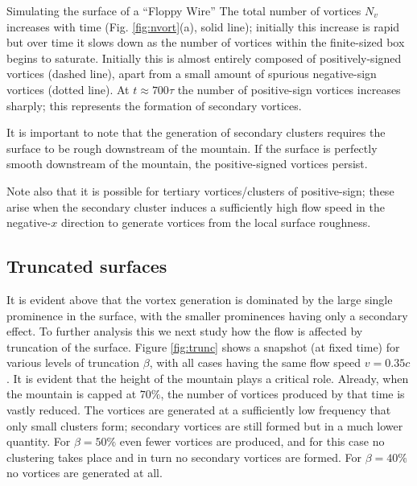 \begin{chapter}{\label{cha:afm}Simulating the surface of a ``Floppy Wire''}
The total number of vortices $N_v$ increases with time (Fig. \ref{fig:nvort}(a), solid line); initially this increase is rapid but over time it slows down as the number of vortices within the finite-sized box begins to saturate.  Initially this is almost entirely composed of positively-signed vortices (dashed line), apart from a small amount of spurious negative-sign vortices (dotted line).  At $t\approx 700 \tau$ the number of positive-sign vortices increases sharply; this represents the formation of secondary vortices. 

It is important to note that the generation of secondary clusters requires the surface to be rough downstream of the mountain.  If the surface is perfectly smooth downstream of the mountain, the positive-signed vortices persist.  

Note also that it is possible for tertiary vortices/clusters of positive-sign; these arise when the secondary cluster induces a sufficiently high flow speed in the negative-$x$ direction to generate vortices from the local surface roughness.

\subsection{Truncated surfaces}

It is evident above that the vortex generation is dominated by the large single prominence in the surface, with the smaller prominences having only a secondary effect.  To further analysis this we next study how the flow is affected by truncation of the surface.  Figure \ref{fig:trunc} shows a snapshot (at fixed time) for various levels of truncation $\beta$, with all cases having the same flow speed $v=0.35c$.  It is evident that the height of the mountain plays a critical role.  Already, when the mountain is capped at $70\%$, the number of vortices produced by that time is vastly reduced.  The vortices are generated at a sufficiently low frequency that only small clusters form; secondary vortices are still formed but in a much lower quantity.  For $\beta=50\%$ even fewer vortices are produced, and for this case no clustering takes place and in turn no secondary vortices are formed.  For $\beta=40\%$ no vortices are generated at all.  


\end{chapter}

